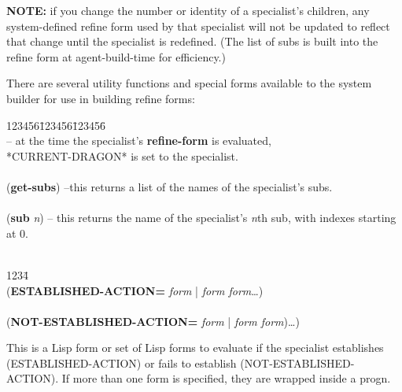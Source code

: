 {\bf NOTE:} if you change the number or identity of a specialist's
children, any system-defined refine form used by that specialist will
not be updated to reflect that change until the specialist is
redefined. (The list of subs is built into the refine form at
agent-build-time for efficiency.)

There are several utility functions and special forms available to the
system builder for use in building refine forms:

\begin{tabbing}
123456\=123456\=123456\= \kill
\\
\>-- at the time the specialist's {\bf
refine-form} is evaluated, \\
\>\>\>*CURRENT-DRAGON* is set to the specialist.\\
\\
\>\>({\bf get-subs}) --this returns a list of the names of the specialist's subs.\\
\\
\>\>({\bf sub} {\it n\/}) -- this returns the name of the specialist's {\it n}th sub, with indexes starting at 0.\\
\\
\end{tabbing}



\begin{tabbing}
1234\= \kill
\\
({\bf ESTABLISHED-ACTION=} {\it form\/} | {\it form form}\ldots) \\
\\
({\bf NOT-ESTABLISHED-ACTION=} {\it form\/} | {\it form
form})\ldots) \\
\end{tabbing}
This is a Lisp form or set of Lisp forms to evaluate if the specialist
establishes (ESTABLISHED-ACTION) or fails to establish
(NOT-ESTABLISHED-ACTION). If more than one form is specified, they are
wrapped inside a progn.

